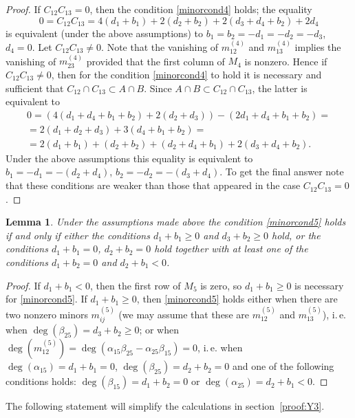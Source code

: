 \documentclass[12pt]{amsart}
\newtheorem{lemma}[equation]{Lemma}
\theoremstyle{definition}
\theoremstyle{remark}
\begin{document}
\begin{proof}
If $C_{12}C_{13}=0$, then the condition
\ref{minorcond4} holds; the equality  
$$0=C_{12}C_{13}=4(d_1+b_1)+2(d_2+b_2)+2(d_3+d_4+b_2)+2d_4$$ 
is equivalent (under the above assumptions) to 
$b_1=b_2=-d_1=-d_2=-d_3$, $d_4=0$. 
Let $C_{12}C_{13}\neq 0$. Note that the vanishing of $m^{(4)}_{12}$ and 
$m^{(4)}_{13}$ implies the vanishing of $m^{(4)}_{23}$ 
provided that the first column of $M_4$ is nonzero.
Hence if $C_{12}C_{13}\neq 0$, then for the condition \ref{minorcond4} to hold
it is necessary and sufficient that $C_{12}\cap C_{13}\subset A\cap B$. 
Since $A\cap B\subset C_{12}\cap C_{13}$, the latter is equivalent to
\begin{multline*} 
0=(4(d_1+d_4+b_1+b_2)+2(d_2+d_3))-(2d_1+d_4+b_1+b_2)=\\
=2(d_1+d_2+d_3)+3(d_4+b_1+b_2)=\\
=2(d_1+b_1)+(d_2+b_2)+(d_2+d_4+b_1)+2(d_3+d_4+b_2).
\end{multline*}
Under the above assumptions this equality is equivalent to 
$b_1=-d_1=-(d_2+d_4)$, 
$b_2=-d_2=-(d_3+d_4)$. To get the final answer note that these conditions 
are weaker than those that appeared in the case $C_{12}C_{13}=0$.
\end{proof}

\begin{lemma}\label{lemma:M5-minors}
Under the assumptions made above the condition \ref{minorcond5} holds 
if and only if either the conditions $d_1+b_1\geqslant 0$ and 
$d_3+b_2\geqslant 0$ hold, or the conditions
$d_1+b_1=0$, $d_2+b_2=0$ hold together with at least one of the conditions 
$d_1+b_2=0$ and $d_2+b_1<0$.
\end{lemma}
\begin{proof}
If $d_1+b_1<0$, then the first row of $M_5$ is zero, so $d_1+b_1\geqslant 0$
is necessary for \ref{minorcond5}. If $d_1+b_1\geqslant 0$, then 
\ref{minorcond5} holds either when there are two nonzero minors $m^{(5)}_{ij}$ 
(we may assume that these are $m^{(5)}_{12}$ and $m^{(5)}_{13}$), 
i.\,e. when $\deg(\beta_{25})=d_3+b_2\geqslant 0$; 
or when
$\deg(m^{(5)}_{12})=\deg(\alpha_{15}\beta_{25}-\alpha_{25}\beta_{15})=0$,
i.\,e. when $\deg(\alpha_{15})=d_1+b_1=0$, $\deg(\beta_{25})=d_2+b_2=0$ 
and one of the following conditions holds: $\deg(\beta_{15})=d_1+b_2=0$ or 
$\deg(\alpha_{25})=d_2+b_1<0$.
\end{proof}

The following statement will simplify the calculations 
in section~\ref{proof:Y3}.
\end{document}

